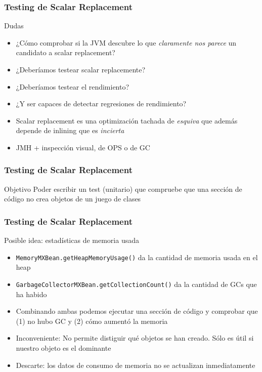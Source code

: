 
\def\ft{Testing de Scalar Replacement}

\begin{frame}[fragile]
  \frametitle{\ft}
  \begin{block}{Dudas}
    \begin{itemize}
    \item ¿Cómo comprobar si la JVM descubre lo que {\it claramente nos parece}
      un candidato a scalar replacement?
    \item ¿Deberíamos testear scalar replacemente?
    \item ¿Deberíamos testear el rendimiento?
    \item ¿Y ser capaces de detectar regresiones de rendimiento?
    \item Scalar replacement es una optimización tachada de {\it esquiva}
      que además depende de inlining que es {\it incierta}
    \item JMH + inspección visual, de OPS o de GC
    \end{itemize}
  \end{block}
\end{frame}

\begin{frame}[fragile]
  \frametitle{\ft}
  \begin{block}{Objetivo}
    Poder escribir un test (unitario) que compruebe
    que una sección de código no crea objetos de un juego de clases
  \end{block}
\end{frame}


\begin{frame}[fragile]
  \frametitle{\ft}
  \begin{block}{Posible idea: estadísticas de memoria usada}
    \begin{itemize}
    \item {\tt MemoryMXBean.getHeapMemoryUsage()}
      da la cantidad de memoria usada en el heap
    \item {\tt GarbageCollectorMXBean.getCollectionCount()}
      da la cantidad de GCs que ha habido
    \item Combinando ambas podemos ejecutar una sección de código
      y comprobar que (1) no hubo GC y (2) cómo aumentó la memoria
    \item Inconveniente:
      No permite distiguir qué objetos se han creado. Sólo es útil
      si nuestro objeto es el dominante
    \item Descarte:
      los datos de consumo de memoria no se actualizan inmediatamente
    \end{itemize}
  \end{block}
\end{frame}


